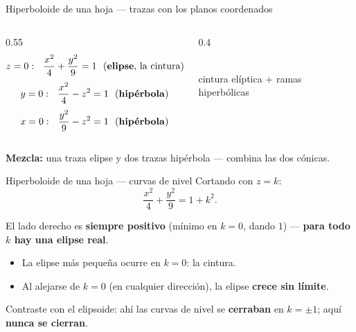 \documentclass[11pt,aspectratio=169]{beamer}
\begin{document}
\begin{frame}{Hiperboloide de una hoja --- trazas con los planos coordenados}
  \begin{columns}
    \begin{column}{0.55\textwidth}
      \[
        z=0:\ \ \frac{x^2}{4}+\frac{y^2}{9}=1 \ \ \text{(\textbf{elipse}, la cintura)}
      \]
      \pause
      \[
        y=0:\ \ \frac{x^2}{4}-z^2=1 \ \ \text{(\textbf{hipérbola})}
      \]
      \pause
      \[
        x=0:\ \ \frac{y^2}{9}-z^2=1 \ \ \text{(\textbf{hipérbola})}
      \]
    \end{column}
    \begin{column}{0.4\textwidth}
      \centering
      \\
      \small\color{gray60} cintura elíptica + ramas hiperbólicas
    \end{column}
  \end{columns}
  \pause
  \vspace{4pt}
  \begin{center}\normalsize\color{tealx}\textbf{Mezcla:} una traza elipse y dos trazas hipérbola --- combina las dos cónicas.\end{center}
\end{frame}

\begin{frame}{Hiperboloide de una hoja --- curvas de nivel}
  Cortando con $z=k$:
  \[
    \frac{x^2}{4}+\frac{y^2}{9}=1+k^2.
  \]
  \pause
  \begin{center}\normalsize\color{tealx}
  El lado derecho es \textbf{siempre positivo} (mínimo en $k=0$, dando $1$) --- \textbf{para todo $k$ hay una elipse real}.
  \end{center}
  \pause
  \begin{itemize}
    \item La elipse más pequeña ocurre en $k=0$: la cintura.
    \item Al alejarse de $k=0$ (en cualquier dirección), la elipse \textbf{crece sin límite}.
  \end{itemize}
  \pause
  \begin{center}\small\color{gray60}
  Contraste con el elipsoide: ahí las curvas de nivel se \textbf{cerraban} en $k=\pm1$; aquí \textbf{nunca se cierran}.
  \end{center}
\end{frame}
\end{document}
